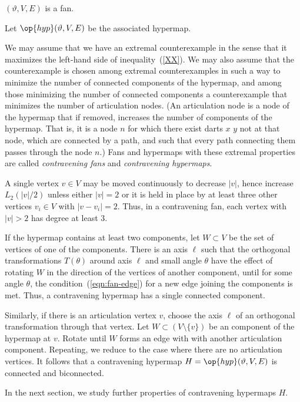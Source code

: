 \begin{lemma}
$(\vartheta,V,E)$ is a fan.
\end{lemma}

Let $\op{hyp}(\vartheta,V,E)$ be the associated hypermap.

We may assume that we have an extremal counterexample
in the sense that it maximizes the left-hand side of inequality~(\ref{XX}).
We may also assume that the counterexample is chosen among extremal
counterexamples in such a way to minimize the number of connected components
of the hypermap, and among those minimizing the number of connected components a counterexample that minimizes the number of articulation nodes.
(An articulation node is a node of the hypermap that if removed, increases
the number of components of
the hypermap.  That is, it is a node $n$ for which there exist darts $x$ $y$ not at that node, which are connected by a path, and such that every path connecting them passes through the node $n$.)   Fans and hypermaps with these
extremal properties are called {\it contravening fans} and {\it
contravening hypermaps}.

A single vertex $v\in V$ may be moved continuously to decrease $|v|$, hence
increase $L_2(|v|/2)$ unless either $|v|=2$ or it is held in place by at least three other vertices $v_i\in V$ with $|v-v_i|=2$.  Thus, in a contravening fan,  each vertex with $|v|>2$ has degree at least $3$. 

If the hypermap contains at least two components, let $W\subset V$ be the set of vertices of one of the components.  There is an axis $\ell$ such that the orthogonal transformations $T(\theta)$ around axis $\ell$ and small angle $\theta$  have the effect of rotating $W$ in the direction of the vertices of another component, until for some angle $\theta$, the condition~(\ref{eqn:fan-edge}) for
a new edge joining the components is met.  Thus, a contravening hypermap has a single connected component.

Similarly, if there is an articulation vertex $v$, choose the axis $\ell$ of an orthogonal transformation through that vertex.  Let $W\subset (V\setminus\{v\})$
be an component of the hypermap at $v$.  Rotate until
$W$ forms an edge with with another articulation component.  Repeating, we reduce to the case where there are no articulation vertices.  
It follows that a contravening hypermap $H=\op{hyp}(\vartheta,V,E)$ is connected and biconnected.

In the next section, we study further properties of contravening hypermaps $H$.





